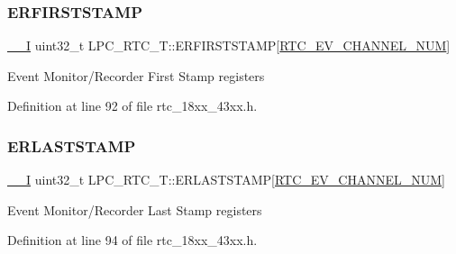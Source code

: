 \mbox{\label{struct_l_p_c___r_t_c___t_a515f67338ca0aa2ebd5544bd5673c85f}} 
\subsubsection{\texorpdfstring{E\+R\+F\+I\+R\+S\+T\+S\+T\+A\+MP}{ERFIRSTSTAMP}}
{\footnotesize\ttfamily \hyperlink{core__sc300_8h_af63697ed9952cc71e1225efe205f6cd3}{\+\_\+\+\_\+I} uint32\+\_\+t L\+P\+C\+\_\+\+R\+T\+C\+\_\+\+T\+::\+E\+R\+F\+I\+R\+S\+T\+S\+T\+A\+MP\mbox{[}\hyperlink{group___r_t_c__18_x_x__43_x_x_ggaac7e8d7c66860037449fdde1bdfb657bae56aa8110b05663f96d666d4ce378c85}{R\+T\+C\+\_\+\+E\+V\+\_\+\+C\+H\+A\+N\+N\+E\+L\+\_\+\+N\+UM}\mbox{]}}

Event Monitor/\+Recorder First Stamp registers 

Definition at line 92 of file rtc\+\_\+18xx\+\_\+43xx.\+h.

\mbox{\label{struct_l_p_c___r_t_c___t_a84ca90f0493e515352b85679d039e56d}} 
\subsubsection{\texorpdfstring{E\+R\+L\+A\+S\+T\+S\+T\+A\+MP}{ERLASTSTAMP}}
{\footnotesize\ttfamily \hyperlink{core__sc300_8h_af63697ed9952cc71e1225efe205f6cd3}{\+\_\+\+\_\+I} uint32\+\_\+t L\+P\+C\+\_\+\+R\+T\+C\+\_\+\+T\+::\+E\+R\+L\+A\+S\+T\+S\+T\+A\+MP\mbox{[}\hyperlink{group___r_t_c__18_x_x__43_x_x_ggaac7e8d7c66860037449fdde1bdfb657bae56aa8110b05663f96d666d4ce378c85}{R\+T\+C\+\_\+\+E\+V\+\_\+\+C\+H\+A\+N\+N\+E\+L\+\_\+\+N\+UM}\mbox{]}}

Event Monitor/\+Recorder Last Stamp registers 

Definition at line 94 of file rtc\+\_\+18xx\+\_\+43xx.\+h.

\mbox{\label{struct_l_p_c___r_t_c___t_a282c9156460496e46e7248d853f95167}} 

